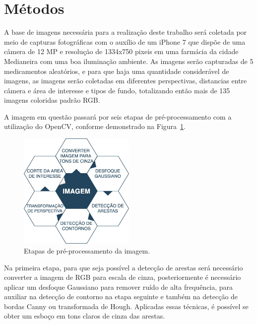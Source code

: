 \section{Métodos}
A base de imagens necessária para a realização deste trabalho será coletada por meio de capturas fotográficas com o auxílio de um iPhone 7 que dispõe de uma câmera de 12 MP e resolução de 1334x750 pixeis em uma farmácia da cidade Medianeira com uma boa iluminação ambiente. As imagens serão capturadas de 5 medicamentos aleatórios, e para que haja uma quantidade considerável de imagens, as imagens serão coletadas em diferentes perspectivas, distancias entre câmera e área de interesse e tipos de fundo, totalizando então mais de 135 imagens coloridas padrão RGB.

A imagem em questão passará por seis etapas de pré-processamento com a utilização do OpenCV, conforme demonstrado na Figura~\ref{fig:diagrama}.

\begin{figure}[h!]
	\centering
	
	\includegraphics[width=0.5\textwidth]{Imagens/diagrama} 
	\caption[Etapas de pré-processamento da imagem.]{Etapas de pré-processamento da imagem.}
	\label{fig:diagrama}
\end{figure}

Na primeira etapa, para que seja possível a detecção de arestas será necessário converter a imagem de RGB para escala de cinza, posteriormente é necessário aplicar um desfoque Gaussiano para remover ruído de alta frequência, para auxiliar na detecção de contorno na etapa seguinte e também na detecção de bordas Canny ou transformada de Hough. Aplicadas essas técnicas, é possível se obter um esboço em tons claros de cinza das arestas.

